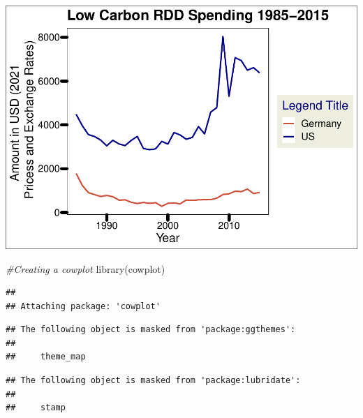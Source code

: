 \documentclass[
  12pt,
]{article}
\newenvironment{Shaded}{\begin{snugshade}}{\end{snugshade}}
\newcommand{\CommentTok}[1]{\textcolor[rgb]{0.56,0.35,0.01}{\textit{#1}}}
\newcommand{\FunctionTok}[1]{\textcolor[rgb]{0.00,0.00,0.00}{#1}}
\newcommand{\NormalTok}[1]{#1}
\begin{document}
\includegraphics{Chang_Jenkins_Mullens_ENV872_Final_files/figure-latex/unnamed-chunk-1-5.pdf}

\begin{Shaded}
\begin{Highlighting}[]
\CommentTok{\#Creating a cowplot}
\FunctionTok{library}\NormalTok{(cowplot)}
\end{Highlighting}
\end{Shaded}

\begin{verbatim}
## 
## Attaching package: 'cowplot'
\end{verbatim}

\begin{verbatim}
## The following object is masked from 'package:ggthemes':
## 
##     theme_map
\end{verbatim}

\begin{verbatim}
## The following object is masked from 'package:lubridate':
## 
##     stamp
\end{verbatim}
\end{document}
